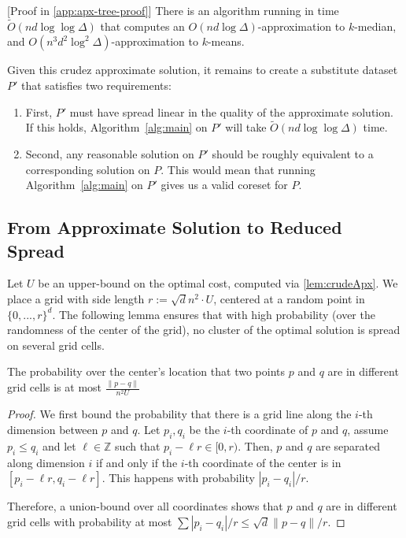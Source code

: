 \begin{lemma}\label{lem:crudeApx}[Proof in \cref{app:apx-tree-proof}]
There is an algorithm running in time $\tilde O(nd \log \log \Delta)$ that computes an $O(n d \log \Delta)$-approximation to $k$-median, and $O(n^3 d^2 \log^2
\Delta)$-approximation to $k$-means.
\end{lemma}

Given this crudez approximate solution, it remains to create a substitute dataset $P'$  that
satisfies two requirements:
\begin{enumerate}
    \item First, $P'$ must have spread linear in the quality of the approximate solution. If this holds, Algorithm~\ref{alg:main} on $P'$ will take
        $\tilde{O}(nd \log \log \Delta)$ time.
    \item Second, any reasonable solution on $P'$ should be roughly equivalent to a corresponding solution on $P$. This would mean that running
        Algorithm~\ref{alg:main} on $P'$ gives us a valid coreset for $P$.
\end{enumerate}

\subsection{From Approximate Solution to Reduced Spread}
\label{ssec:reduce_spread}

Let $U$ be an upper-bound on the optimal cost, computed via \cref{lem:crudeApx}. We place a grid with side length $r:= \sqrt{d} n^2\cdot U$, centered at
a random point in $\{0, ..., r\}^d$.  The following lemma ensures that with high probability (over the randomness of the center of the grid), no cluster of the
optimal solution is spread on several grid cells.

\begin{lemma}\label{lem:quadtreeSep}

The probability over the center's location that two points $p$ and $q$ are in different grid cells is at most $\frac{\|p-q\|}{n^2 U}$

\end{lemma}
\begin{proof}
We first bound the probability that there is a grid line along the $i$-th dimension between $p$ and $q$. Let $p_i, q_i$ be the $i$-th coordinate of $p$ and $q$,
assume $p_i \leq q_i$ and let $\ell \in \mathbb{Z}$ such that $p_i - \ell r \in [0, r)$.  Then, $p$ and $q$ are separated along dimension $i$ if and only if the
$i$-th coordinate of the center is in $[p_i - \ell r, q_i - \ell r]$. This happens with probability $|p_i - q_i|/r$. 

Therefore, a union-bound over all coordinates shows that $p$ and $q$ are in different grid cells with probability at most $\sum |p_i-q_i| / r \leq \sqrt{d} \|p-q\|/r$.
\end{proof}

